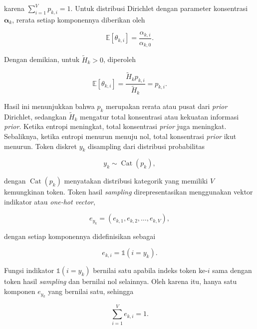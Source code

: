 karena $\sum_{i=1}^{V}p_{k,i}=1$. Untuk distribusi Dirichlet dengan parameter konsentrasi $\boldsymbol{\alpha}_k$, rerata setiap komponennya diberikan oleh

\begin{equation}
\mathbb{E}[\theta_{k,i}]
=
\frac{\alpha_{k,i}}{\alpha_{k,0}}.
\label{eq:moi-dirichlet-mean}
\end{equation}

Dengan demikian, untuk $\widetilde H_k>0$, diperoleh

\begin{equation}
\mathbb{E}[\theta_{k,i}]
=
\frac{\widetilde H_kp_{k,i}}{\widetilde H_k}
=
p_{k,i}.
\label{eq:moi-prior-mean}
\end{equation}

Hasil ini menunjukkan bahwa $p_k$ merupakan rerata atau pusat dari \textit{prior} Dirichlet, sedangkan $\widetilde H_k$ mengatur total konsentrasi atau kekuatan informasi \textit{prior}. Ketika entropi meningkat, total konsentrasi \textit{prior} juga meningkat. Sebaliknya, ketika entropi menurun menuju nol, total konsentrasi \textit{prior} ikut menurun.
Token diskret $y_k$ disampling dari distribusi probabilitas

\begin{equation}
y_k\sim\operatorname{Cat}(p_k),
\label{eq:moi-categorical-sampling}
\end{equation}

dengan $\operatorname{Cat}(p_k)$ menyatakan distribusi kategorik yang memiliki $V$ kemungkinan token. Token hasil \textit{sampling} direpresentasikan menggunakan vektor indikator atau \textit{one-hot vector},

\begin{equation}
e_{y_k}
=
(e_{k,1},e_{k,2},\ldots,e_{k,V}),
\label{eq:moi-onehot}
\end{equation}

dengan setiap komponennya didefinisikan sebagai

\begin{equation}
e_{k,i}
=
\mathbb{1}(i=y_k).
\label{eq:moi-onehot-component}
\end{equation}

Fungsi indikator $\mathbb{1}(i=y_k)$ bernilai satu apabila indeks token ke-$i$ sama dengan token hasil \textit{sampling} dan bernilai nol selainnya. Oleh karena itu, hanya satu komponen $e_{y_k}$ yang bernilai satu, sehingga

\begin{equation}
\sum_{i=1}^{V}e_{k,i}=1.
\label{eq:moi-onehot-sum}
\end{equation}

